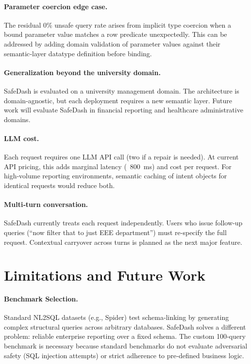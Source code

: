 \documentclass[11pt]{article}
\begin{document}
\paragraph{Parameter coercion edge case.} The residual 0\% unsafe query rate arises from implicit type coercion when a bound parameter value matches a row predicate unexpectedly. This can be addressed by adding domain validation of parameter values against their semantic‑layer datatype definition before binding.

\paragraph{Generalization beyond the university domain.} SafeDash is evaluated on a university management domain. The architecture is domain‑agnostic, but each deployment requires a new semantic layer. Future work will evaluate SafeDash in financial reporting and healthcare administrative domains.

\paragraph{LLM cost.} Each request requires one LLM API call (two if a repair is needed). At current API pricing, this adds marginal latency (~800 ms) and cost per request. For high‑volume reporting environments, semantic caching of intent objects for identical requests would reduce both.

\paragraph{Multi‑turn conversation.} SafeDash currently treats each request independently. Users who issue follow‑up queries (``now filter that to just EEE department'') must re‑specify the full request. Contextual carryover across turns is planned as the next major feature.

\section{Limitations and Future Work\label{sec:limitations}}
\paragraph{Benchmark Selection.} Standard NL2SQL datasets (e.g., Spider) test schema‑linking by generating complex structural queries across arbitrary databases. SafeDash solves a different problem: reliable enterprise reporting over a fixed schema. The custom 100‑query benchmark is necessary because standard benchmarks do not evaluate adversarial safety (SQL injection attempts) or strict adherence to pre‑defined business logic.
\end{document}
